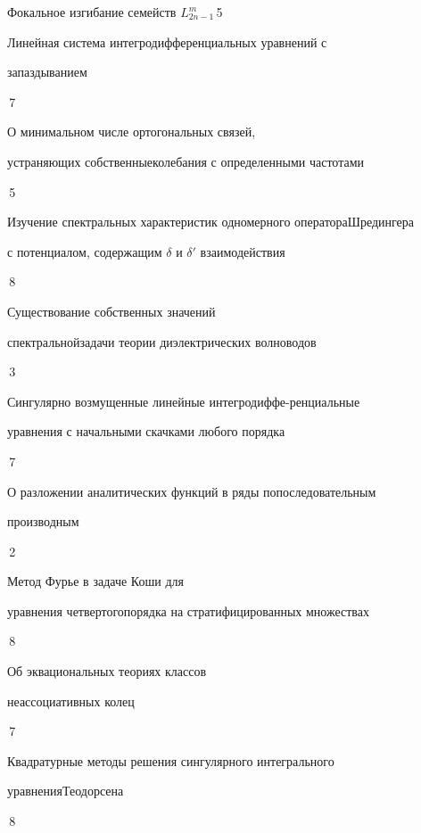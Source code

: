 

{Фокальное изгибание семейств $L^m_{2n-1}$}{\No\,5}




{Линейная система интегродифференциальных уравнений с 


запаздыванием}{\No\,7}




{О минимальном числе ортогональных связей,


устраняющих собственные\newline колебания с определенными частотами}{\No\,5}




{Изучение спектральных характеристик одномерного оператора\newline Шредингера 


с потенциалом, содержащим $\delta$ и $\delta'$ взаимодействия}{\No\,8}




{Существование собственных значений 


спектральной\newline задачи теории диэлектрических волноводов}{\No\,3}




{Сингулярно возмущенные линейные интегродиффе-\newline ренциальные


уравнения с начальными скачками любого порядка}{\No\,7}




{О разложении аналитических функций в ряды по\newline последовательным


производным}{\No\,2}




{Метод Фурье в задаче Коши для 


уравнения четвертого\newline порядка на стратифицированных множествах}{\No\,8}




{Об эквациональных теориях классов  


неассоциативных колец}{\No\,7}




{Квадратурные методы решения сингулярного интегрального 


уравнения\newline Теодорсена}{\No\,8}


